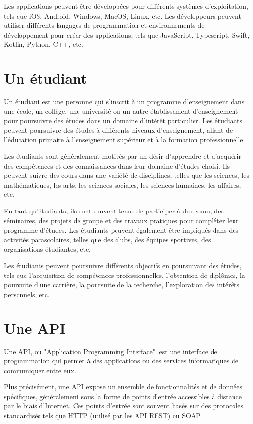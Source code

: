 Les applications peuvent être développées pour différents systèmes d'exploitation, tels que iOS, Android, Windows, MacOS, Linux, etc. Les développeurs peuvent utiliser différents langages de programmation et environnements de développement pour créer des applications, tels que JavaScript, Typescript, Swift, Kotlin, Python, C++, etc.

\section{Un étudiant}\label{subsec:etudiants}
Un étudiant est une personne qui s'inscrit à un programme d'enseignement dans une école, un collège, une université ou un autre établissement d'enseignement pour poursuivre des études dans un domaine d'intérêt particulier. Les étudiants peuvent poursuivre des études à différents niveaux d'enseignement, allant de l'éducation primaire à l'enseignement supérieur et à la formation professionnelle.

Les étudiants sont généralement motivés par un désir d'apprendre et d'acquérir des compétences et des connaissances dans leur domaine d'études choisi. Ils peuvent suivre des cours dans une variété de disciplines, telles que les sciences, les mathématiques, les arts, les sciences sociales, les sciences humaines, les affaires, etc.

En tant qu'étudiants, ils sont souvent tenus de participer à des cours, des séminaires, des projets de groupe et des travaux pratiques pour compléter leur programme d'études. Les étudiants peuvent également être impliqués dans des activités parascolaires, telles que des clubs, des équipes sportives, des organisations étudiantes, etc.

Les étudiants peuvent poursuivre différents objectifs en poursuivant des études, tels que l'acquisition de compétences professionnelles, l'obtention de diplômes, la poursuite d'une carrière, la poursuite de la recherche, l'exploration des intérêts personnels, etc.

\section{Une API}\label{subsec:api}
Une API, ou "Application Programming Interface", est une interface de programmation qui permet à des applications ou des services informatiques de communiquer entre eux.

Plus précisément, une API expose un ensemble de fonctionnalités et de données spécifiques, généralement sous la forme de points d'entrée accessibles à distance par le biais d'Internet. Ces points d'entrée sont souvent basés sur des protocoles standardisés tels que HTTP (utilisé par les API REST) ou SOAP.

